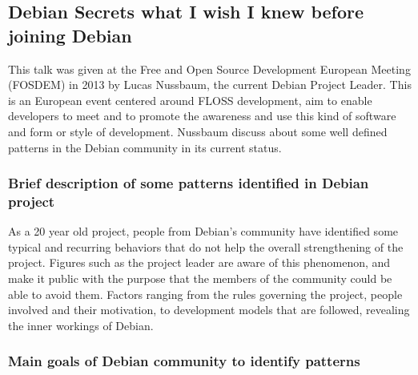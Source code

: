 \documentclass[11pt]{article} %
\begin{document}
\subsection{Debian Secrets what I wish I knew before joining Debian}

This talk was given at the Free and Open Source Development European Meeting (FOSDEM) in 2013 by Lucas Nussbaum, the current Debian Project Leader. This is an European event centered around FLOSS development, aim to enable developers to meet and to promote the awareness and use this kind of software and form or style of development. Nussbaum discuss about some well defined patterns in the Debian community in its current status.

\subsubsection{Brief description of some patterns identified in Debian project}

As a 20 year old project, people from Debian's community have identified some typical and recurring behaviors that do not help the overall strengthening of the project. Figures such as the project leader are aware of this phenomenon, and make it public with the purpose that the members of the community could be able to avoid them. Factors ranging from the rules governing the project, people involved and their motivation, to development models that are followed, revealing the inner workings of Debian.

\subsubsection{Main goals of Debian community to identify patterns}
\end{document}
